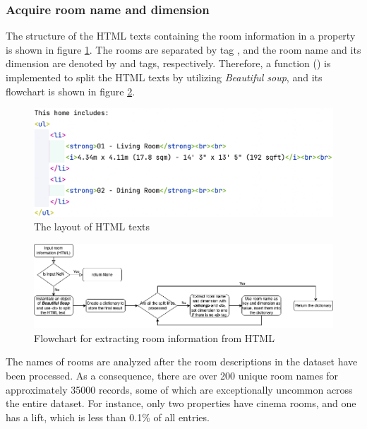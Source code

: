 \documentclass[12pt,twoside]{report}
\begin{document}
\subsubsection{Acquire room name and dimension}
The structure of the HTML texts containing the room information in a property is shown in figure \ref{html_structure}. The rooms are separated by tag , and the room name and its dimension are denoted by  and  tags, respectively. Therefore, a function () is implemented to split the HTML texts by utilizing \textit{Beautiful soup}, and its flowchart is shown in figure \ref{html_room_info}.
\begin{figure}[H]
	\centering
	\includegraphics[width=15cm]{html_structure}
	\caption{The layout of HTML texts}
	\label{html_structure}
\end{figure}

\begin{figure}[!htbp]
	\centering
	\includegraphics[width=1\linewidth]{html_room_info}
	\caption{Flowchart for extracting room information from HTML}
	\label{html_room_info}
\end{figure}

The names of rooms are analyzed after the room descriptions in the dataset have been processed. As a consequence, there are over 200 unique room names for approximately 35000 records, some of which are exceptionally uncommon across the entire dataset. For instance, only two properties have cinema rooms, and one has a lift, which is less than 0.1\% of all entries.  
\\
\end{document}
